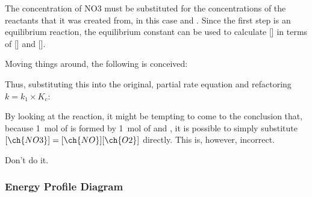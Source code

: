 				\mathdiagram{
					\[ R = k\sbs{1}[\ch{NO3}][\ch{NO}] \]
				}

				The concentration of NO3 must be substituted for the concentrations of the reactants that it was created from, in this case
				 and . Since the first step is an equilibrium reaction, the equilibrium constant \Kc can be used to calculate
				[] in terms of [] and [].

				\mathdiagram{
					\[ K_{c} = \frac{[\ch{NO3}]}{[\ch{NO}][\ch{O2}]} \]
				}

				\pagebreak
				Moving things around, the following is conceived:

				\mathdiagram{
					\[ [\ch{NO3}] = K_{c}[\ch{NO}][\ch{O2}] \]
				}

				Thus, substituting this into the original, partial rate equation and refactoring $k = k_{1} \times K_{c}$:

				\mathdiagram{
					\[ R = k_{1}K_{c}[\ch{NO}][\ch{O2}][\ch{NO}] = k[\ch{NO}]^{2}[\ch{O2}]\]
				}


				By looking at the reaction, it might be tempting to come to the conclusion that, because \SI{1}{\mole} of  is formed by
				\SI{1}{\mole} of  and , it is possible to simply substitute $[\ch{NO3}] = [\ch{NO}][\ch{O2}]$ directly.
				This is, however, incorrect.

				Don't do it.



			\subsubsection{Energy Profile Diagram}


